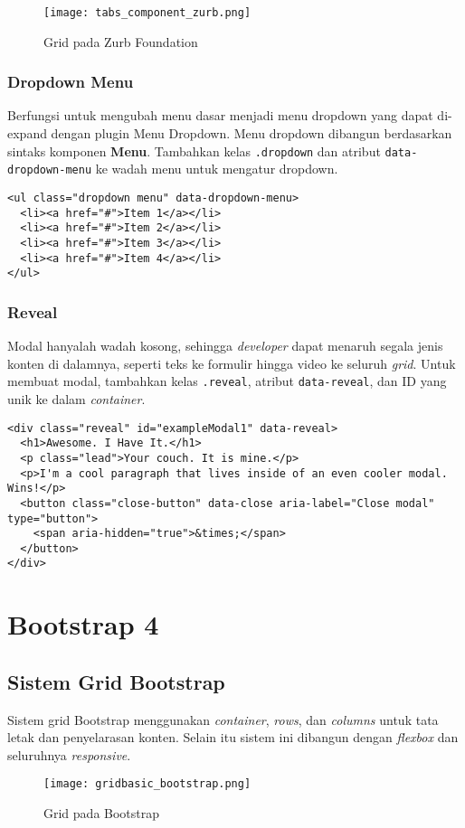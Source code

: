 \begin{figure} [H]
	\centering  
	\texttt{[image: tabs\_component\_zurb.png]}  
	\caption{Grid pada Zurb Foundation}
\end{figure}

\subsubsection{Dropdown Menu}
Berfungsi untuk mengubah menu dasar menjadi menu dropdown yang dapat di-expand dengan plugin Menu Dropdown.
Menu dropdown dibangun berdasarkan sintaks komponen \textbf{Menu}. Tambahkan kelas \texttt{.dropdown} dan atribut \texttt{data-dropdown-menu} ke wadah menu untuk mengatur dropdown. 
\begin{lstlisting}[frame=single] 
<ul class="dropdown menu" data-dropdown-menu>
  <li><a href="#">Item 1</a></li>
  <li><a href="#">Item 2</a></li>
  <li><a href="#">Item 3</a></li>
  <li><a href="#">Item 4</a></li>
</ul>
\end{lstlisting}

\subsubsection{Reveal}
Modal hanyalah wadah kosong, sehingga \textit{developer} dapat menaruh segala jenis konten di dalamnya, seperti teks ke formulir hingga video ke seluruh \textit{grid}.
Untuk membuat modal, tambahkan kelas \texttt{.reveal}, atribut \texttt{data-reveal}, dan ID yang unik ke dalam \textit{container}.

\begin{lstlisting}[frame=single, basicstyle=\tiny] 
<div class="reveal" id="exampleModal1" data-reveal>
  <h1>Awesome. I Have It.</h1>
  <p class="lead">Your couch. It is mine.</p>
  <p>I'm a cool paragraph that lives inside of an even cooler modal. Wins!</p>
  <button class="close-button" data-close aria-label="Close modal" type="button">
    <span aria-hidden="true">&times;</span>
  </button>
</div>
\end{lstlisting} 

\section{Bootstrap 4}
\subsection{Sistem Grid Bootstrap}
Sistem grid Bootstrap menggunakan \textit{container}, \textit{rows}, dan \textit{columns} untuk tata letak dan penyelarasan konten. Selain itu sistem ini dibangun dengan \textit{flexbox} dan seluruhnya \textit{responsive}. \cite{bootstrap:19}
\begin{figure} [H]
	\centering  
	\texttt{[image: gridbasic\_bootstrap.png]}  
	\caption{Grid pada Bootstrap} 
\end{figure}

